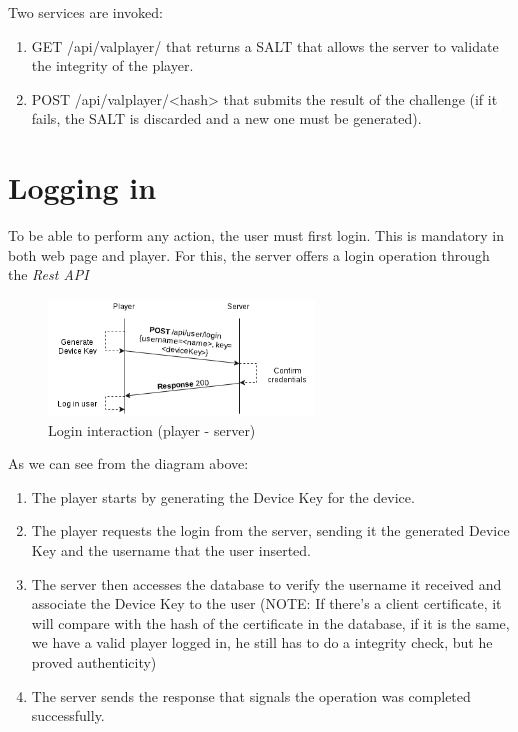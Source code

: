 \documentclass[11pt,a4paper]{report}
\begin{document}
Two services are invoked:  
\begin{enumerate}
\item GET   /api/valplayer/ that returns a SALT that allows the server to validate the integrity of the player.
\item POST  /api/valplayer/<hash> that submits the result of the challenge (if it fails, the SALT is discarded and a new one must be generated).
\end{enumerate}

\section{Logging in}
To be able to perform any action, the user must first login. This is mandatory in both web page and player.
\newline For this, the server offers a login operation through the \emph{Rest API}

\begin{figure}[H]
\centerline{\includegraphics[width=200pt]{images/loginDiagram.png}}
\caption{Login interaction (player - server)}
\label{player}
\end{figure}

As we can see from the diagram above:
\begin{enumerate}
  \item The player starts by generating the Device Key for the device. \label{sec:diagfile}
  \item The player requests the login from the server, sending it the generated Device Key and the username that the user inserted. 
  \item The server then accesses the database to verify the username it received and associate the Device Key to the user (NOTE: If there's a client certificate, it will compare with the hash of the certificate in the database, if it is the same, we have a valid player logged in, he still has to do a integrity check, but he proved authenticity)
  \item The server sends the response that signals the operation was completed successfully.
\end{enumerate}
\end{document}
